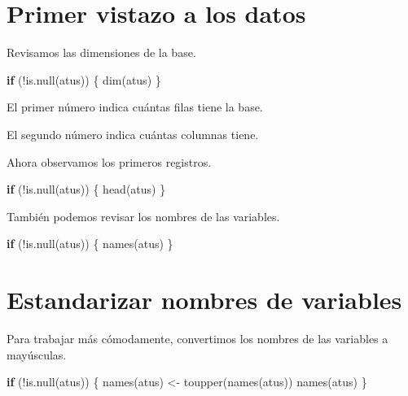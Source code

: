 \documentclass[
  11pt,
  letterpaper,
]{book}
\newenvironment{Shaded}{\begin{snugshade}}{\end{snugshade}}
\newcommand{\ControlFlowTok}[1]{\textcolor[rgb]{0.00,0.23,0.31}{\textbf{#1}}}
\newcommand{\FunctionTok}[1]{\textcolor[rgb]{0.28,0.35,0.67}{#1}}
\newcommand{\NormalTok}[1]{\textcolor[rgb]{0.00,0.23,0.31}{#1}}
\newcommand{\OtherTok}[1]{\textcolor[rgb]{0.00,0.23,0.31}{#1}}
\newcommand{\SpecialCharTok}[1]{\textcolor[rgb]{0.37,0.37,0.37}{#1}}
\begin{document}
\section{Primer vistazo a los datos}\label{primer-vistazo-a-los-datos}

Revisamos las dimensiones de la base.

\begin{Shaded}
\begin{Highlighting}[]
\ControlFlowTok{if}\NormalTok{ (}\SpecialCharTok{!}\FunctionTok{is.null}\NormalTok{(atus)) \{}
  \FunctionTok{dim}\NormalTok{(atus)}
\NormalTok{\}}
\end{Highlighting}
\end{Shaded}

El primer número indica cuántas filas tiene la base.

El segundo número indica cuántas columnas tiene.

Ahora observamos los primeros registros.

\begin{Shaded}
\begin{Highlighting}[]
\ControlFlowTok{if}\NormalTok{ (}\SpecialCharTok{!}\FunctionTok{is.null}\NormalTok{(atus)) \{}
  \FunctionTok{head}\NormalTok{(atus)}
\NormalTok{\}}
\end{Highlighting}
\end{Shaded}

También podemos revisar los nombres de las variables.

\begin{Shaded}
\begin{Highlighting}[]
\ControlFlowTok{if}\NormalTok{ (}\SpecialCharTok{!}\FunctionTok{is.null}\NormalTok{(atus)) \{}
  \FunctionTok{names}\NormalTok{(atus)}
\NormalTok{\}}
\end{Highlighting}
\end{Shaded}

\section{Estandarizar nombres de
variables}\label{estandarizar-nombres-de-variables}

Para trabajar más cómodamente, convertimos los nombres de las variables
a mayúsculas.

\begin{Shaded}
\begin{Highlighting}[]
\ControlFlowTok{if}\NormalTok{ (}\SpecialCharTok{!}\FunctionTok{is.null}\NormalTok{(atus)) \{}
  \FunctionTok{names}\NormalTok{(atus) }\OtherTok{\textless{}{-}} \FunctionTok{toupper}\NormalTok{(}\FunctionTok{names}\NormalTok{(atus))}
  \FunctionTok{names}\NormalTok{(atus)}
\NormalTok{\}}
\end{Highlighting}
\end{Shaded}
\end{document}
